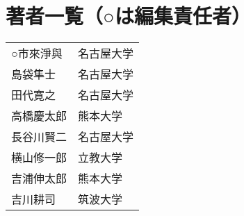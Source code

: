 \newpage
\section*{著者一覧（○は編集責任者）}
\begin{tabular}{ll}
○市來淨與 & 名古屋大学 \\
島袋隼士 & 名古屋大学 \\
田代寛之 & 名古屋大学 \\
高橋慶太郎 & 熊本大学 \\
長谷川賢二 & 名古屋大学 \\
横山修一郎 & 立教大学 \\
吉浦伸太郎 & 熊本大学 \\
吉川耕司 & 筑波大学 \\
\end{tabular}

